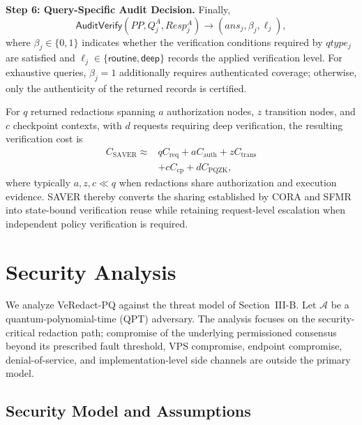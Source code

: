\documentclass[lettersize,journal]{IEEEtran}
\begin{document}
\medskip
\noindent\textbf{Step 6: Query-Specific Audit Decision.}
Finally,
\begin{equation}
\mathsf{AuditVerify}
(PP,Q_j^A,Resp_j^A)
\rightarrow
(ans_j,\beta_j,\ell_j),
\end{equation}
where $\beta_j\in\{0,1\}$ indicates whether the verification conditions
required by $qtype_j$ are satisfied and
$\ell_j\in\{\mathsf{routine},\mathsf{deep}\}$ records the applied
verification level. For exhaustive queries, $\beta_j=1$ additionally
requires authenticated coverage; otherwise, only the authenticity of
the returned records is certified.

For $q$ returned redactions spanning $a$ authorization nodes, $z$
transition nodes, and $c$ checkpoint contexts, with $d$ requests
requiring deep verification, the resulting verification cost is
\begin{equation}
\begin{aligned}
C_{\mathrm{SAVER}}
\approx{}&
qC_{\mathrm{req}}
+aC_{\mathrm{auth}}
+zC_{\mathrm{trans}}\\
&+cC_{\mathrm{cp}}
+dC_{\mathrm{PQZK}},
\end{aligned}
\end{equation}
where typically $a,z,c\ll q$ when redactions share authorization and
execution evidence. SAVER thereby converts the sharing established by
CORA and SFMR into state-bound verification reuse while retaining
request-level escalation when independent policy verification is
required.

    
    
    

\section{Security Analysis}
\label{sec:security}

We analyze VeRedact-PQ against the threat model of Section~III-B.
Let $\mathcal{A}$ be a quantum-polynomial-time (QPT) adversary.
The analysis focuses on the security-critical redaction path; compromise
of the underlying permissioned consensus beyond its prescribed fault
threshold, VPS compromise, endpoint compromise, denial-of-service, and
implementation-level side channels are outside the primary model.

\subsection{Security Model and Assumptions}
\end{document}
